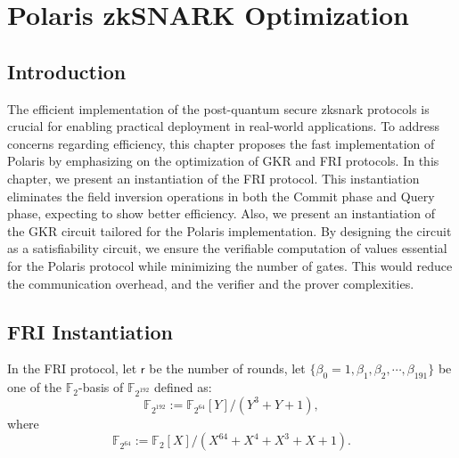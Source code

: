 \chapter{Polaris zkSNARK Optimization}\label{ch:polaris}

\section{Introduction}
The efficient implementation of the  post-quantum secure \gls{zksnark} protocols is crucial for enabling practical deployment in real-world applications. To address concerns regarding efficiency, this chapter proposes the fast implementation of Polaris by emphasizing on the optimization of GKR and FRI protocols.  In this chapter, we present an instantiation of the FRI protocol. This instantiation eliminates the field inversion operations in both the Commit phase and Query phase, expecting to show  better efficiency. Also, we present an instantiation of the GKR circuit tailored for the Polaris implementation. By designing the circuit as a  satisfiability circuit, we ensure the verifiable computation of values essential for the Polaris protocol while minimizing the number of gates. This would reduce the communication overhead, and the verifier and the prover complexities.

\section{FRI Instantiation}
\label{sec:FRI_instantiation}

In the FRI protocol, let $\mathsf{r}$ be the number of rounds, let $\{\beta_0 = 1, \beta_1, \beta_2,\cdots, \beta_{191}\}$ be one of the $\mathbb{F}_2$-basis of $\mathbb{F}_{2^{192}}$ defined as:
\begin{equation}\label{eq_F_2_192}
	\mathbb{F}_{2^{192}} := \mathbb{F}_{2^{64}}[Y]/(Y^3 + Y + 1),
\end{equation}
where
\begin{equation}\label{eq_F_2_64}
	\mathbb{F}_{2^{64}} := \mathbb{F}_{2}[X]/(X^{64} + X^4 + X^3 + X + 1).
\end{equation}
\newline

